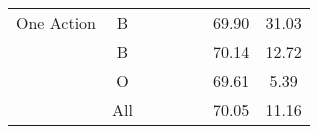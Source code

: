\begin{tabular}{ccllllcc}
One Action                                                 & B                    &                             &                               &                             &                               & 69.90      & 31.03       \\
\rowcolor[HTML]{F3F3F3} 
\cellcolor[HTML]{F3F3F3}                                   & B                    &                             &                               &                             &                               & 70.14      & 12.72       \\
\rowcolor[HTML]{F3F3F3} 
\cellcolor[HTML]{F3F3F3}                                   & O                    &                             &                               &                             &                               & 69.61      & 5.39        \\
\rowcolor[HTML]{F3F3F3} 
\multirow{-3}{*}{\cellcolor[HTML]{F3F3F3}Two+}             & All                  &                             &                               &                             &                               & 70.05      & 11.16      
\end{tabular}